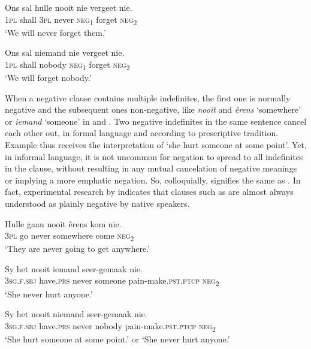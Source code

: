 \documentclass[output=paper,colorlinks,citecolor=brown]{langscibook}
\begin{document}
    \ex\label{ex:afr:28d}
        \gll Ons sal hulle nooit nie vergeet nie. \\
             \textsc{1pl} shall \textsc{3pl} never    \textsc{neg}\textsubscript{1} forget  \textsc{neg}\textsubscript{2} \\
        \glt ‘We will never forget them.’
        
    \ex\label{ex:afr:28e}
        \gll Ons sal niemand nie vergeet nie. \\
             1\textsc{pl} shall nobody \textsc{neg}\textsubscript{1} forget  \textsc{neg}\textsubscript{2}\\
        \glt ‘We will forget nobody.’
    \z
\z 


When a negative clause contains multiple indefinites, the first one is normally negative and the subsequent ones non-negative, like \textit{nooit} and \textit{êrens} ‘somewhere’ or \textit{iemand} ‘someone’ in  and . Two negative indefinites in the same sentence cancel each other out, in formal language and according to prescriptive tradition. Example  thus receives the interpretation of ‘she hurt someone at some point’. Yet, in informal language, it is not uncommon for negation to spread to all indefinites in the clause, without resulting in any mutual cancelation of negative meanings or implying a more emphatic negation. So, colloquially,  signifies the same as . In fact, experimental research by \citet{HuddlestoneSwart2014} indicates that clauses such as  are almost always understood as plainly negative by native speakers.

\ea\label{ex:afr:29}
    \ea\label{ex:afr:29a}
        \gll Hulle gaan nooit êrens kom nie. \\ 
             3\textsc{pl} go never somewhere come \textsc{neg}\textsubscript{2} \\
        \glt ‘They are never going to get anywhere.’
    
    \ex\label{ex:afr:29b}
        \gll Sy het nooit iemand seer-gemaak nie. \\
             \textsc{3sg.f.sbj} have.\textsc{prs} never someone pain-make.\textsc{pst.ptcp} \textsc{neg}\textsubscript{2} \\
        \glt ‘She never hurt anyone.’
    
    \ex\label{ex:afr:29c}
        \gll Sy het nooit niemand seer-gemaak nie. \\
             \textsc{3sg.f.sbj} have.\textsc{prs} never nobody pain-make.\textsc{pst.ptcp} \textsc{neg}\textsubscript{2}\\
        \glt ‘She hurt someone at some point.’ or ‘She never hurt anyone.’
    \z
\z
\end{document}
